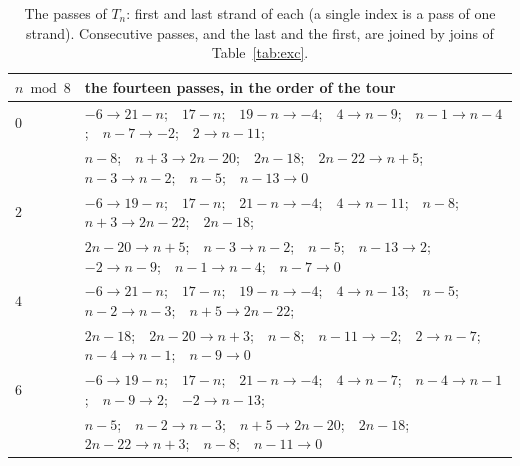 \documentclass[11pt]{amsart}
\theoremstyle{remark}
\begin{document}
\begin{table}[t]
\centering
\footnotesize
\begin{tabular}{l@{\ \ }l}
$n\bmod 8$ & the fourteen passes, in the order of the tour\\ \hline
$0$ & $-6\to21-n$;\ \ $17-n$;\ \ $19-n\to-4$;\ \ $4\to n-9$;\ \ $n-1\to n-4$;\ \ $n-7\to-2$;\ \ $2\to n-11$;\\
 & $n-8$;\ \ $n+3\to2n-20$;\ \ $2n-18$;\ \ $2n-22\to n+5$;\ \ $n-3\to n-2$;\ \ $n-5$;\ \ $n-13\to0$\\[3pt]
$2$ & $-6\to19-n$;\ \ $17-n$;\ \ $21-n\to-4$;\ \ $4\to n-11$;\ \ $n-8$;\ \ $n+3\to2n-22$;\ \ $2n-18$;\\
 & $2n-20\to n+5$;\ \ $n-3\to n-2$;\ \ $n-5$;\ \ $n-13\to2$;\ \ $-2\to n-9$;\ \ $n-1\to n-4$;\ \ $n-7\to0$\\[3pt]
$4$ & $-6\to21-n$;\ \ $17-n$;\ \ $19-n\to-4$;\ \ $4\to n-13$;\ \ $n-5$;\ \ $n-2\to n-3$;\ \ $n+5\to2n-22$;\\
 & $2n-18$;\ \ $2n-20\to n+3$;\ \ $n-8$;\ \ $n-11\to-2$;\ \ $2\to n-7$;\ \ $n-4\to n-1$;\ \ $n-9\to0$\\[3pt]
$6$ & $-6\to19-n$;\ \ $17-n$;\ \ $21-n\to-4$;\ \ $4\to n-7$;\ \ $n-4\to n-1$;\ \ $n-9\to2$;\ \ $-2\to n-13$;\\
 & $n-5$;\ \ $n-2\to n-3$;\ \ $n+5\to2n-20$;\ \ $2n-18$;\ \ $2n-22\to n+3$;\ \ $n-8$;\ \ $n-11\to0$
\end{tabular}
\caption{The passes of $T_n$: first and last strand of each (a single index is a pass of one strand). Consecutive
passes, and the last and the first, are joined by joins of Table~\ref{tab:exc}.}
\label{tab:pass}
\end{table}
\end{document}
